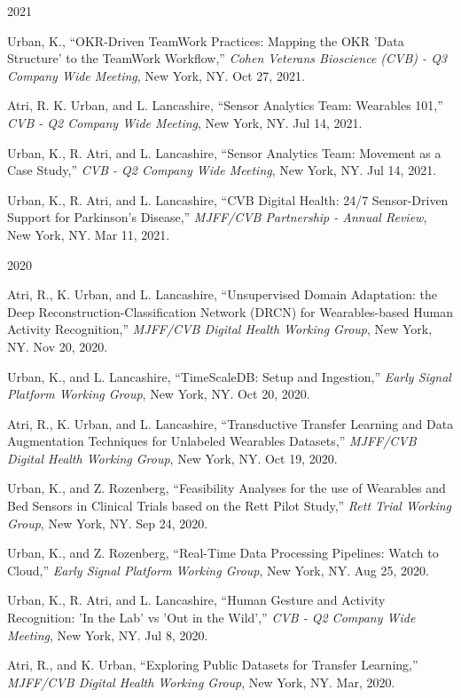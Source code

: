 \begin{center} \Large{2021} \end{center}
\normalsize
\begin{itemize*}
  \item
    Urban, K., 
    ``OKR-Driven TeamWork Practices: Mapping the OKR 'Data Structure' to the TeamWork Workflow,'' 
    {\em Cohen Veterans Bioscience (CVB) - Q3 Company Wide Meeting},
    New York, NY.  Oct 27, 2021.
  \item
    Atri, R. K. Urban, and L. Lancashire,
    ``Sensor Analytics Team: Wearables 101,''
    {\em CVB - Q2 Company Wide Meeting},
    New York, NY.  Jul 14, 2021.
  \item
    Urban, K., R. Atri, and L. Lancashire,
    ``Sensor Analytics Team: Movement as a Case Study,''
    {\em CVB - Q2 Company Wide Meeting},
    New York, NY.  Jul 14, 2021.
  \item 
    Urban, K., R. Atri, and L. Lancashire,
    ``CVB Digital Health: 24/7 Sensor-Driven Support for Parkinson's Disease,''
    {\em MJFF/CVB Partnership - Annual Review},
    New York, NY.  Mar 11, 2021.
\end{itemize*}



\begin{center} \Large{2020} \end{center}
\normalsize
\begin{itemize*}
  \item
    Atri, R., K. Urban, and L. Lancashire,
    ``Unsupervised Domain Adaptation: the Deep Reconstruction-Classification Network (DRCN)
    for Wearables-based Human Activity Recognition,''
    {\em MJFF/CVB Digital Health Working Group},
    New York, NY.  Nov 20, 2020.
  \item
    Urban, K., and L. Lancashire,
    ``TimeScaleDB: Setup and Ingestion,''
    {\em Early Signal Platform Working Group},
    New York, NY.  Oct 20, 2020.
  \item
    Atri, R., K. Urban, and L. Lancashire,
    ``Transductive Transfer Learning and Data Augmentation Techniques
    for Unlabeled Wearables Datasets,''
    {\em MJFF/CVB Digital Health Working Group},
    New York, NY.  Oct 19, 2020.
  \item
     Urban, K., and Z. Rozenberg,
    ``Feasibility Analyses for the use of Wearables and Bed Sensors in
    Clinical Trials based on the Rett Pilot Study,''
   {\em Rett Trial Working Group},
   New York, NY.  Sep 24, 2020.
  \item
     Urban, K., and Z. Rozenberg,
    ``Real-Time Data Processing Pipelines: Watch to Cloud,''
    {\em Early Signal Platform Working Group},
    New York, NY.  Aug 25, 2020.
  \item
    Urban, K., R. Atri, and L. Lancashire,
    ``Human Gesture and Activity Recognition: 'In the Lab' vs 'Out in the Wild','' 
    {\em CVB - Q2 Company Wide Meeting},
    New York, NY.  Jul 8, 2020.
  \item
    Atri, R., and K. Urban,
    ``Exploring Public Datasets for Transfer Learning,''
    {\em MJFF/CVB Digital Health Working Group},
    New York, NY.  Mar, 2020.
\end{itemize*}



